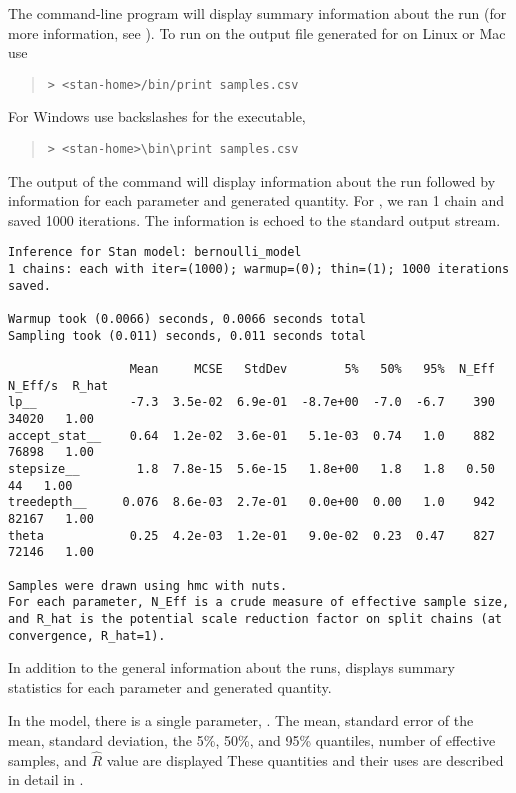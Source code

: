 The command-line program  will display summary
information about the run (for more information, see
). To run  on the output file
generated for  on Linux or Mac use
%
\begin{quote}
\begin{Verbatim}[fontshape=sl,fontsize=\small]
> <stan-home>/bin/print samples.csv
\end{Verbatim}
\end{quote}
%
For Windows use backslashes for the executable,
%
\begin{quote}
\begin{Verbatim}[fontshape=sl,fontsize=\small]
> <stan-home>\bin\print samples.csv
\end{Verbatim}
\end{quote}
%
The output of the command will display information about the run
followed by information for each parameter and generated quantity. For
, we ran 1 chain and saved 1000 iterations. The information is
echoed to the standard output stream.
%
\begin{Verbatim}[fontshape=sl,fontsize=\footnotesize]
Inference for Stan model: bernoulli_model
1 chains: each with iter=(1000); warmup=(0); thin=(1); 1000 iterations saved.

Warmup took (0.0066) seconds, 0.0066 seconds total
Sampling took (0.011) seconds, 0.011 seconds total

                 Mean     MCSE   StdDev        5%   50%   95%  N_Eff  N_Eff/s  R_hat
lp__             -7.3  3.5e-02  6.9e-01  -8.7e+00  -7.0  -6.7    390    34020   1.00
accept_stat__    0.64  1.2e-02  3.6e-01   5.1e-03  0.74   1.0    882    76898   1.00
stepsize__        1.8  7.8e-15  5.6e-15   1.8e+00   1.8   1.8   0.50       44   1.00
treedepth__     0.076  8.6e-03  2.7e-01   0.0e+00  0.00   1.0    942    82167   1.00
theta            0.25  4.2e-03  1.2e-01   9.0e-02  0.23  0.47    827    72146   1.00

Samples were drawn using hmc with nuts.
For each parameter, N_Eff is a crude measure of effective sample size,
and R_hat is the potential scale reduction factor on split chains (at 
convergence, R_hat=1).
\end{Verbatim}
%
In addition to the general information about the runs, 
displays summary statistics for each parameter and generated
quantity.

In the  model, there is a single parameter,
. The mean, standard error of the mean, standard
deviation, the 5\%, 50\%, and 95\% quantiles,
number of effective samples, and $\hat{R}$ value are displayed
These quantities and their uses are described in detail in 
.

